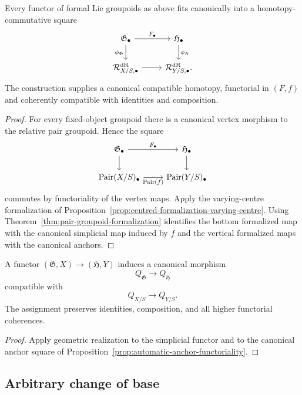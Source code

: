 \begin{proposition}
\label{prop:automatic-anchor-functoriality}
Every functor of formal Lie groupoids as above fits canonically into a
homotopy-commutative square
\[
\begin{tikzcd}
\mathfrak G_\bullet \arrow[r,"F_\bullet"] \arrow[d,"\phi_{\mathfrak G}"'] &
\mathfrak H_\bullet \arrow[d,"\phi_{\mathfrak H}"]\\
\mathcal R^{\mathrm{dR}}_{X/S,\bullet} \arrow[r] &
\mathcal R^{\mathrm{dR}}_{Y/S,\bullet}.
\end{tikzcd}
\]
The construction supplies a canonical compatible homotopy, functorial in
$(F,f)$ and coherently compatible with identities and composition.
\end{proposition}

\begin{proof}
For every fixed-object groupoid there is a canonical vertex morphism to the
relative pair groupoid.  Hence the square
\[
\begin{tikzcd}
\mathfrak G_\bullet \arrow[r,"F_\bullet"] \arrow[d] &
\mathfrak H_\bullet \arrow[d]\\
\operatorname{Pair}(X/S)_\bullet
\arrow[r,"\operatorname{Pair}(f)"'] &
\operatorname{Pair}(Y/S)_\bullet
\end{tikzcd}
\]
commutes by functoriality of the vertex maps.  Apply the varying-centre
formalization of Proposition~\ref{prop:centred-formalization-varying-centre}.
Using
Theorem~\ref{thm:pair-groupoid-formalization} identifies the bottom formalized
map with the canonical simplicial map induced by $f$ and the vertical formalized maps with the canonical anchors.
\end{proof}

\begin{proposition}
\label{prop:quotient-functoriality}
A functor
$(\mathfrak G,X)\to(\mathfrak H,Y)$
induces a canonical morphism
\[
    Q_{\mathfrak G}\longrightarrow Q_{\mathfrak H}
\]
compatible with
\[
    Q_{X/S}\longrightarrow Q_{Y/S}.
\]
The assignment preserves identities, composition, and all higher
functorial coherences.
\end{proposition}

\begin{proof}
Apply geometric realization to the simplicial functor and to the canonical
anchor square of
Proposition~\ref{prop:automatic-anchor-functoriality}.
\end{proof}

\subsection{Arbitrary change of base}

